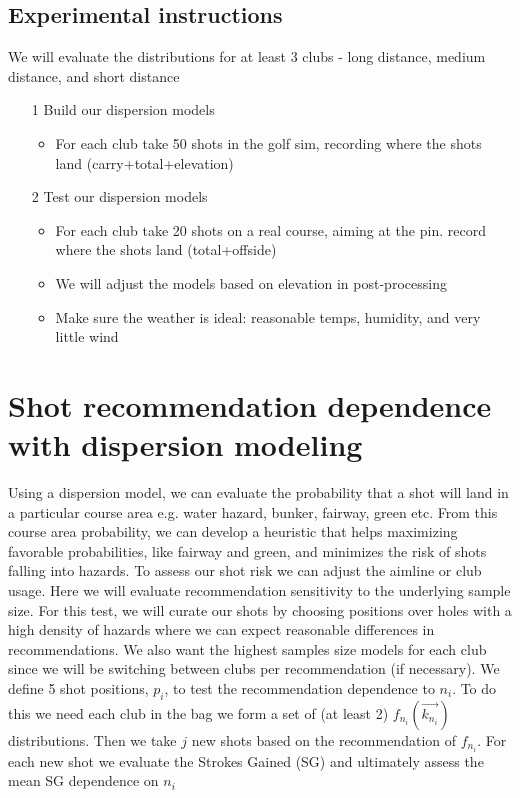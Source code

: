 \documentclass{article}
\begin{document}
\subsection{Experimental instructions}
We will evaluate the distributions for at least 3 clubs - long distance, medium distance, and short distance\\
\begin{itemize}
	\item[1] Build our dispersion models
		\begin{itemize} 
			\item For each club take 50 shots in the golf sim, recording where the shots land (carry+total+elevation)
		\end{itemize}
	\item[2] Test our dispersion models
		\begin{itemize}
			\item For each club take 20 shots on a real course, aiming at the pin. record where the shots land (total+offside)
			\item We will adjust the models based on elevation in post-processing
			\item Make sure the weather is ideal: reasonable temps, humidity, and very little wind
		\end{itemize}
\end{itemize}


\section{Shot recommendation dependence with dispersion modeling}
Using a dispersion model, we can evaluate the probability that a shot will land in a particular course area e.g. water hazard, bunker, fairway, green etc. From this course area probability, we can develop a heuristic that helps maximizing favorable probabilities, like fairway and green, and minimizes the risk of shots falling into hazards. To assess our shot risk we can adjust the aimline or club usage. Here we will evaluate recommendation sensitivity to the underlying sample size. For this test, we will curate our shots by choosing positions over holes with a high density of hazards where we can expect reasonable differences in recommendations. We also want the highest samples size models for each club since we will be switching between clubs per recommendation (if necessary). We define 5 shot positions, $p_i$, to test the recommendation dependence to $n_i$. To do this we need each club in the bag we form a set of (at least 2) $f_{n_i}( \vec{k_{n_i}} )$ distributions. Then we take $j$ new shots based on the recommendation of $f_{n_i}$. For each new shot we evaluate the Strokes Gained (SG) and ultimately assess the mean SG dependence on $n_i$
\end{document}
